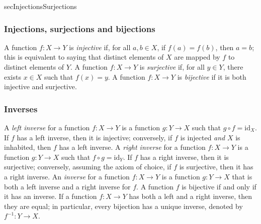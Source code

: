 \begin{tldr}{secInjectionsSurjections}

\subsubsection*{Injections, surjections and bijections}

\begin{tldrlist}
 A function $f : X \to Y$ is \textit{injective} if, for all $a,b \in X$, if $f(a)=f(b)$, then $a=b$; this is equivalent to saying that distinct elements of $X$ are mapped by $f$ to distinct elements of $Y$.
 A function $f : X \to Y$ is \textit{surjective} if, for all $y \in Y$, there exists $x \in X$ such that $f(x)=y$.
 A function $f : X \to Y$ is \textit{bijective} if it is both injective and surjective.
\end{tldrlist}

\subsubsection*{Inverses}

\begin{tldrlist}
 A \textit{left inverse} for a function $f : X \to Y$ is a function $g : Y \to X$ such that $g \circ f = \mathrm{id}_X$. If $f$ has a left inverse, then it is injective; conversely, if $f$ is injected \textit{and} $X$ is inhabited, then $f$ has a left inverse.
 A \textit{right inverse} for a function $f : X \to Y$ is a function $g : Y \to X$ such that $f \circ g = \mathrm{id}_Y$. If $f$ has a right inverse, then it is surjective; conversely, assuming the axiom of choice, if $f$ is surjective, then it has a right inverse.
 An \textit{inverse} for a function $f : X \to Y$ is a function $g : Y \to X$ that is both a left inverse and a right inverse for $f$. A function $f$ is bijective if and only if it has an inverse.
 If a function $f : X \to Y$ has both a left and a right inverse, then they are equal; in particular, every bijection has a unique inverse, denoted by $f^{-1} : Y \to X$.
\end{tldrlist}

\end{tldr}

